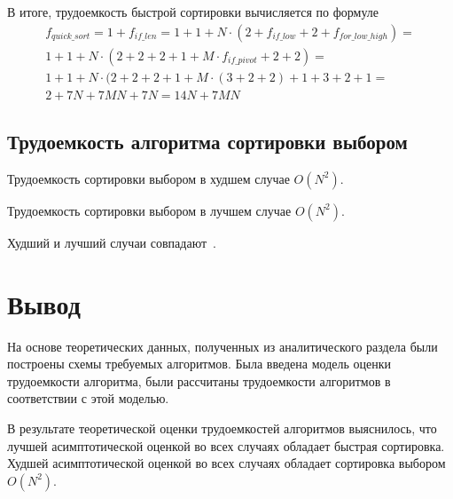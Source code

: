 В итоге, трудоемкость быстрой сортировки вычисляется по формуле
\begin{multline}
\label{eq:2.5}
f_{quick\_sort} = 1 + f_{if\_len} = 1 + 1 + N \cdot (2 + f_{if\_low} + 2 + f_{for\_low\_high}) = \\
1 + 1 + N \cdot (2 + 2 + 2 + 1 + M \cdot f_{if\_pivot} + 2 + 2) = \\
1 + 1 + N \cdot (2 + 2 + 2 + 1 + M \cdot (3 + 2 + 2) + 1 + 3 + 2 + 1 = \\
2 + 7N + 7MN +7N = 14N + 7MN 
\end{multline}

\subsection{Трудоемкость алгоритма сортировки выбором}

Трудоемкость сортировки выбором в худшем случае $O(N^2)$.

Трудоемкость сортировки выбором в лучшем случае $O(N^2)$.

Худший и лучший случаи совпадают~\cite{selectionsort}.


\section*{Вывод}
На основе теоретических данных, полученных из аналитического раздела были построены схемы требуемых алгоритмов. 
Была введена модель оценки трудоемкости алгоритма, были рассчитаны трудоемкости алгоритмов в соответствии с этой моделью.

В результате теоретической оценки трудоемкостей алгоритмов выяснилось, что лучшей асимптотической оценкой во всех случаях обладает быстрая сортировка.
Худшей асимптотической оценкой во всех случаях обладает сортировка выбором $O(N^2)$.